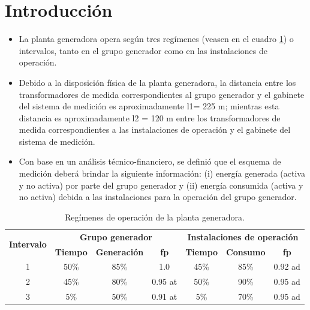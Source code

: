 \section{Introducción}
\begin{itemize}
  \item La planta generadora opera según tres regímenes (veasen en el cuadro \ref{tab:regimenes_operacion}) o intervalos, tanto en el grupo generador como en las instalaciones de operación.
  \item Debido a la disposición física de la planta generadora, la distancia entre los transformadores de medida correspondientes al grupo generador y el gabinete del sistema de medición es aproximadamente l1= 225 m; mientras esta distancia es aproximadamente l2 = 120 m entre los transformadores de medida correspondientes a las instalaciones de operación y el gabinete del sistema de medición.
  \item Con base en un análisis técnico-financiero, se definió que el esquema de medición deberá brindar la siguiente información: (i) energía generada (activa y no activa) por parte del grupo generador y (ii) energía consumida (activa y no activa) debida a las instalaciones para la operación del grupo generador.

\end{itemize}

\begin{table}[t]
  \centering
  \caption{Regímenes de operación de la planta generadora.}
  \label{tab:regimenes_operacion}
  \begin{tabular}{ccccccc}
    \toprule
    \multirow{2}{*}{\textbf{Intervalo}} & \multicolumn{3}{c}{\textbf{Grupo generador}} & \multicolumn{3}{c}{\textbf{Instalaciones de operación}} \\
    \cmidrule(lr){2-4} \cmidrule(lr){5-7}
    & \textbf{Tiempo} & \textbf{Generación} & \textbf{fp} & \textbf{Tiempo} & \textbf{Consumo} & \textbf{fp} \\
    \midrule
    1 & 50\% & 85\% & 1.0 & 45\% & 85\% & 0.92 ad \\
    2 & 45\% & 80\% & 0.95 at & 50\% & 90\% & 0.95 ad \\
    3 & 5\% & 50\% & 0.91 at & 5\% & 70\% & 0.95 ad \\
    \bottomrule
  \end{tabular}
\end{table}




